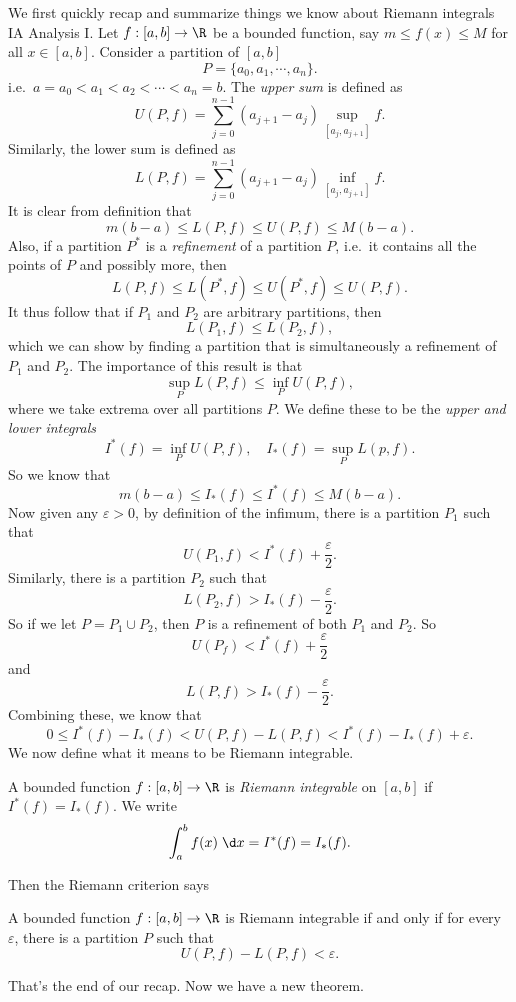 \documentclass[a4paper]{article}
\begin{document}
We first quickly recap and summarize things we know about Riemann integrals IA Analysis I. Let $f: [a, b] \to \R$ be a bounded function, say $m \leq f(x) \leq M$ for all $x\in [a, b]$. Consider a partition of $[a, b]$
\[
  P = \{a_0, a_1, \cdots, a_n\}.
\]
i.e.\ $a = a_0 < a_1 < a_2 < \cdots < a_n = b$. The \emph{upper sum} is defined as
\[
  U(P, f) = \sum_{j = 0}^{n - 1} (a_{j + 1} - a_j) \sup_{[a_j, a_{j + 1}]} f.
\]
Similarly, the lower sum is defined as
\[
  L(P, f) = \sum_{j = 0}^{n - 1} (a_{j + 1} - a_j) \inf_{[a_j, a_{j + 1}]} f.
\]
It is clear from definition that
\[
  m(b - a) \leq L(P, f) \leq U(P, f) \leq M(b - a).
\]
Also, if a partition $P^*$ is a \emph{refinement} of a partition $P$, i.e.\ it contains all the points of $P$ and possibly more, then
\[
  L(P, f) \leq L(P^*, f) \leq U(P^*, f) \leq U(P, f).
\]
It thus follow that if $P_1$ and $P_2$ are arbitrary partitions, then
\[
  L(P_1, f) \leq L(P_2, f),
\]
which we can show by finding a partition that is simultaneously a refinement of $P_1$ and $P_2$. The importance of this result is that
\[
  \sup_{P} L(P, f) \leq \inf_P U(P, f),
\]
where we take extrema over all partitions $P$. We define these to be the \emph{upper and lower integrals}
\[
  I^*(f) = \inf_P U(P, f),\quad I_*(f) = \sup_P L(p, f).
\]
So we know that
\[
  m(b - a) \leq I_*(f) \leq I^*(f) \leq M(b - a).
\]
Now given any $\varepsilon > 0$, by definition of the infimum, there is a partition $P_1$ such that
\[
  U(P_1, f) < I^*(f) + \frac{\varepsilon}{2}.
\]
Similarly, there is a partition $P_2$ such that
\[
  L(P_2, f) > I_*(f) - \frac{\varepsilon}{2}.
\]
So if we let $P = P_1 \cup P_2$, then $P$ is a refinement of both $P_1$ and $P_2$. So
\[
  U(P_f) < I^*(f) + \frac{\varepsilon}{2}
\]
and
\[
  L(P, f) > I_*(f) - \frac{\varepsilon}{2}.
\]
Combining these, we know that
\[
  0 \leq I^*(f) - I_*(f) < U(P, f) - L(P, f) < I^*(f) - I_*(f) + \varepsilon.
\]
We now define what it means to be Riemann integrable.
\begin{defi}
  A bounded function $f: [a, b] \to \R$ is \emph{Riemann integrable} on $[a, b]$ if $I^*(f) = I_*(f)$. We write
  \[
    \int_a^b f(x)\;\d x = I^*(f) = I_*(f).
  \]
\end{defi}

Then the Riemann criterion says
\begin{thm}
  A bounded function $f: [a, b] \to \R$ is Riemann integrable if and only if for every $\varepsilon$, there is a partition $P$ such that
  \[
    U(P, f) - L(P, f) < \varepsilon.
  \]
\end{thm}
That's the end of our recap. Now we have a new theorem.
\end{document}
